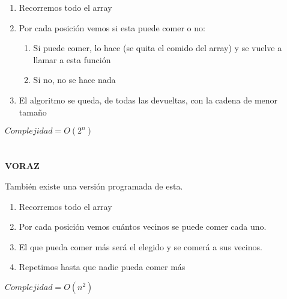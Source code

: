 \documentclass[11pt, a4paper]{exam}
\begin{document}
\begin{questions}
\begin{solution}
            \begin{enumerate}
                \item Recorremos todo el array
                \item Por cada posición vemos si esta puede comer o no:
                   \begin{enumerate}
                      \item Si puede comer, lo hace (se quita el comido del array) y se vuelve a llamar a esta función
                      \item Si no, no se hace nada
                   \end{enumerate}
                \item El algoritmo se queda, de todas las devueltas, con la cadena de menor tamaño
            \end{enumerate}
            $Complejidad = O(2^n)$
            \\
            \\
            \\
            \textbf{VORAZ} 



            También existe una versión programada de esta.
                    \begin{enumerate}
                \item Recorremos todo el array
                \item Por cada posición vemos cuántos vecinos se puede comer cada uno.
                \item El que pueda comer más será el elegido y se comerá a sus vecinos.
                \item Repetimos hasta que nadie pueda comer más
            \end{enumerate}
            $Complejidad = O(n^2)$
            
    \end{solution}
    

\end{questions}



\end{document}
